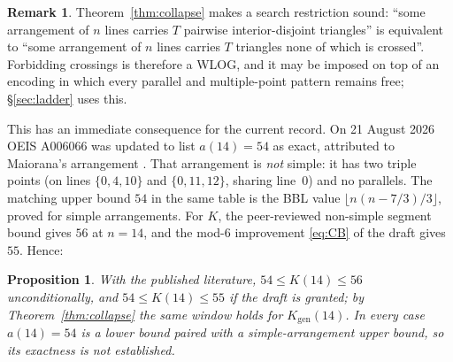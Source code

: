 \documentclass[11pt]{article}
\newtheorem{proposition}[theorem]{Proposition}
\theoremstyle{definition}
\newtheorem{remark}[theorem]{Remark}
\newcommand{\Kgen}{K_{\mathrm{gen}}}
\begin{document}
\begin{remark}\label{rem:wlog}
Theorem~\ref{thm:collapse} makes a search restriction sound: ``some
arrangement of $n$ lines carries $T$ pairwise interior-disjoint triangles''
is equivalent to ``some arrangement of $n$ lines carries $T$ triangles none
of which is crossed''. Forbidding crossings is therefore a WLOG, and it may
be imposed on top of an encoding in which every parallel and multiple-point
pattern remains free; \S\ref{sec:ladder} uses this.
\end{remark}


This has an immediate consequence for the current record. On 21 August 2026
OEIS A006066 \cite{OEIS} was updated to list $a(14)=54$ as exact, attributed
to Maiorana's arrangement \cite{Maiorana}. That arrangement is \emph{not}
simple: it has two triple points (on lines $\{0,4,10\}$ and $\{0,11,12\}$,
sharing line~$0$) and no parallels. The matching upper bound $54$ in the same
table is the BBL value $\lfloor n(n-7/3)/3\rfloor$, proved for simple
arrangements. For $K$, the peer-reviewed non-simple segment bound
\cite{FK1999} gives $56$ at $n=14$, and the mod-$6$ improvement
\eqref{eq:CB} of the draft \cite{CB2007} gives $55$. Hence:

\begin{proposition}\label{prop:status14}
With the published literature, $54\le K(14)\le 56$ unconditionally, and
$54\le K(14)\le55$ if the draft \cite{CB2007} is granted; by
Theorem~\ref{thm:collapse} the same window holds for $\Kgen(14)$. In every
case $a(14)=54$ is a lower bound paired with a simple-arrangement upper
bound, so its exactness is not established.
\end{proposition}
\end{document}
